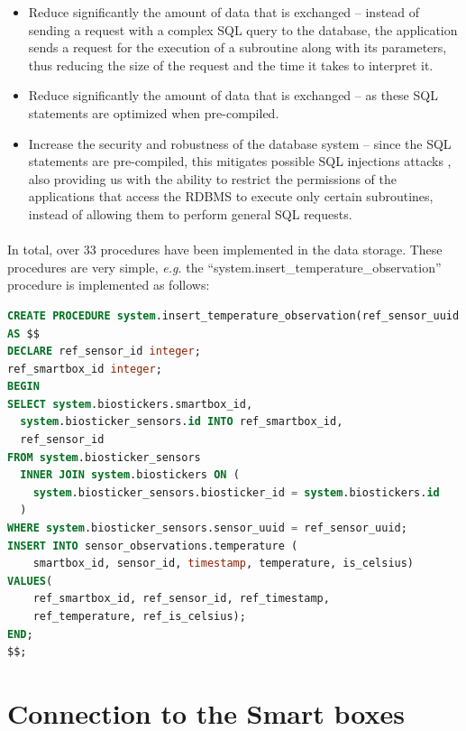 \begin{itemize}
    \item Reduce significantly the amount of data that is exchanged -- instead of sending a request with a complex \acs{SQL} query to the database, the application sends a request for the execution of a subroutine along with its parameters, thus reducing the size of the request and the time it takes to interpret it.
    \item Reduce significantly the amount of data that is exchanged -- as these \acs{SQL} statements are optimized when pre-compiled.
    \item Increase the security and robustness of the database system -- since the \acs{SQL} statements are pre-compiled, this mitigates possible \acs{SQL} injections attacks \cite{clarke2012sql}, also providing us with the ability to restrict the permissions of the applications that access the \acs{RDBMS} to execute only certain subroutines, instead of allowing them to perform general \acs{SQL} requests.
\end{itemize}

\paragraph{} In total, over 33 procedures have been implemented in the data storage. These procedures are very simple, \textit{e.g.} the {\color{blue}``system.insert\_temperature\_observation''} procedure is implemented as follows:

\begin{lstlisting}[language=sql]     
CREATE PROCEDURE system.insert_temperature_observation(ref_sensor_uuid uuid, ref_timestamp timestamp with time zone, ref_temperature double precision, ref_is_celsius boolean) LANGUAGE plpgsql SECURITY DEFINER
AS $$
DECLARE ref_sensor_id integer;
ref_smartbox_id integer;
BEGIN
SELECT system.biostickers.smartbox_id,
  system.biosticker_sensors.id INTO ref_smartbox_id,
  ref_sensor_id
FROM system.biosticker_sensors
  INNER JOIN system.biostickers ON (
    system.biosticker_sensors.biosticker_id = system.biostickers.id
  )
WHERE system.biosticker_sensors.sensor_uuid = ref_sensor_uuid;
INSERT INTO sensor_observations.temperature (
    smartbox_id, sensor_id, timestamp, temperature, is_celsius)
VALUES(
    ref_smartbox_id, ref_sensor_id, ref_timestamp, 
    ref_temperature, ref_is_celsius);
END;
$$;
\end{lstlisting}


\section{Connection to the Smart boxes}

